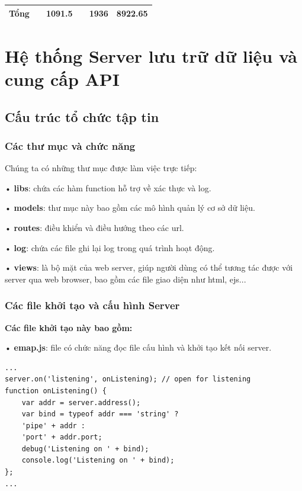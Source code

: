 \begin{table}[H]
\begin{tabular}{|l|l|r|r|r|r|}
\textbf{Tổng} & \textbf{}                                                             & \textbf{1091.5}                                                                             & \textbf{}                                                                                  & \textbf{1936}                                                                                   & \textbf{8922.65}                                                                       \\ \hline
\end{tabular}
\end{table}

\section{Hệ thống Server lưu trữ dữ liệu và cung cấp API}

\subsection{Cấu trúc tổ chức tập tin}
\subsubsection*{Các thư mục và chức năng}
Chúng ta có những thư mục được làm việc trực tiếp:

• \textbf{libs}: chứa các hàm function hỗ trợ về xác thực và log.

• \textbf{models}: thư mục này bao gồm các mô hình quản lý cơ sở dữ liệu.

• \textbf{routes}: điều khiển và điều hướng theo các url.

• \textbf{log}: chứa các file ghi lại log trong quá trình hoạt động.

• \textbf{views}: là bộ mặt của web server, giúp người dùng có thể tương tác được với server qua web browser, bao gồm các file giao diện như html, ejs...   


\subsubsection*{Các file khởi tạo và cấu hình Server}

\textbf{Các file khởi tạo này bao gồm:}

• \textbf{emap.js}: file có chức năng đọc file cấu hình và khởi tạo kết nối server.
\begin{lstlisting}[caption=emap.js]
...
server.on('listening', onListening); // open for listening
function onListening() {
	var addr = server.address();
	var bind = typeof addr === 'string' ?
	'pipe' + addr :
	'port' + addr.port;
	debug('Listening on ' + bind);
	console.log('Listening on ' + bind);
};
...
\end{lstlisting}

